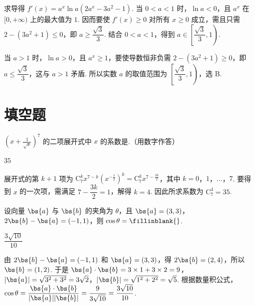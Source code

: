 \begin{solution}
求导得 \(f'(x)=a^x\ln a\left(2a^x-3a^2-1\right)\). 当 \(0<a<1\) 时，\(\ln a<0\)，且 \(a^x\) 在 \([0,+\infty)\) 上的最大值为 \(1\). 因而要使 \(f'(x)\geqslant0\) 对所有 \(x\geqslant0\) 成立，需且只需 \(2-(3a^2+1)\leqslant0\)，即 \(a\geqslant\dfrac{\sqrt{3}}{3}\). 结合 \(0<a<1\)，得到 \(a\in\left[\dfrac{\sqrt{3}}{3},1\right)\).

当 \(a>1\) 时，\(\ln a>0\)，且 \(a^x\geqslant1\)，要使导数恒非负需 \(2-(3a^2+1)\geqslant0\)，即 \(a\leqslant\dfrac{\sqrt{3}}{3}\)，这与 \(a>1\) 矛盾. 所以实数 \(a\) 的取值范围为 \(\left[\dfrac{\sqrt{3}}{3},1\right)\)，选 B.
\end{solution}

\section{填空题}
\begin{problem}
\(\left(x + \frac{1}{\sqrt{x}}\right)^7\) 的二项展开式中 \(x\) 的系数是\fillinblank{}.（用数字作答）
\end{problem}

\begin{answer}
\(35\)
\end{answer}

\begin{solution}
展开式的第 \(k+1\) 项为 \(\mathrm C_7^k x^{7-k}\left(x^{-\frac{1}{2}}\right)^k=\mathrm C_7^k x^{7-\frac{3k}{2}}\)，其中 \(k=0\)，\(1\)，\(\dots\)，\(7\). 要得到 \(x\) 的一次项，需满足 \(7-\dfrac{3k}{2}=1\)，解得 \(k=4\). 因此所求系数为 \(\mathrm C_7^4=35\).
\end{solution}

\begin{problem}
设向量 \(\bs{a}\) 与 \(\bs{b}\) 的夹角为 \(\theta\)，且 \(\bs{a} = (3, 3)\)，\(2\bs{b} - \bs{a} = (-1, 1)\)，则 \(\cos \theta =\fillinblank{}\).
\end{problem}

\begin{answer}
\(\dfrac{3\sqrt{10}}{10}\)
\end{answer}

\begin{solution}
由 \(2\bs{b}-\bs{a}=(-1,1)\) 和 \(\bs{a}=(3,3)\)，得 \(2\bs{b}=(2,4)\)，所以 \(\bs{b}=(1,2)\). 于是 \(\bs{a}\cdot\bs{b}=3\times1+3\times2=9\)，\(\lvert\bs{a}\rvert=\sqrt{3^2+3^2}=3\sqrt{2}\)，\(\lvert\bs{b}\rvert=\sqrt{1^2+2^2}=\sqrt{5}\). 根据数量积公式，\(\cos\theta=\dfrac{\bs{a}\cdot\bs{b}}{\lvert\bs{a}\rvert\lvert\bs{b}\rvert}=\dfrac{9}{3\sqrt{10}}=\dfrac{3\sqrt{10}}{10}\).
\end{solution}


